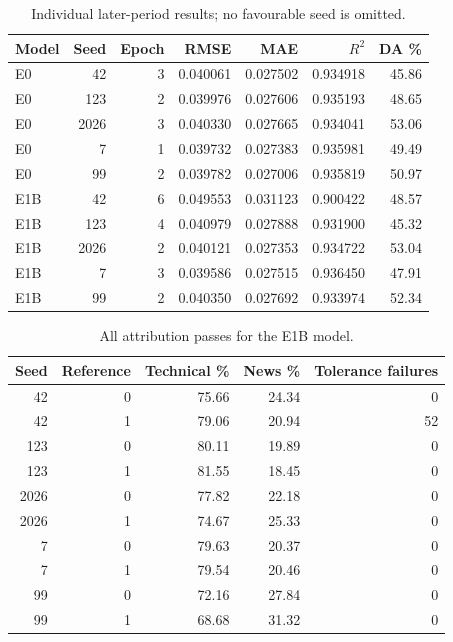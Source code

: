 \begin{table}[!htbp]\centering\small
\caption{Individual later-period results; no favourable seed is omitted.}\label{tab:seeds}
\begin{tabular}{lrrrrrr}\toprule
Model & Seed & Epoch & RMSE & MAE & $R^2$ & DA \%\\\midrule
E0 & 42 & 3 & 0.040061 & 0.027502 & 0.934918 & 45.86 \\
E0 & 123 & 2 & 0.039976 & 0.027606 & 0.935193 & 48.65 \\
E0 & 2026 & 3 & 0.040330 & 0.027665 & 0.934041 & 53.06 \\
E0 & 7 & 1 & 0.039732 & 0.027383 & 0.935981 & 49.49 \\
E0 & 99 & 2 & 0.039782 & 0.027006 & 0.935819 & 50.97 \\
E1B & 42 & 6 & 0.049553 & 0.031123 & 0.900422 & 48.57 \\
E1B & 123 & 4 & 0.040979 & 0.027888 & 0.931900 & 45.32 \\
E1B & 2026 & 2 & 0.040121 & 0.027353 & 0.934722 & 53.04 \\
E1B & 7 & 3 & 0.039586 & 0.027515 & 0.936450 & 47.91 \\
E1B & 99 & 2 & 0.040350 & 0.027692 & 0.933974 & 52.34 \\
\bottomrule\end{tabular}
\end{table}

\begin{table}[!htbp]\centering\small
\caption{All attribution passes for the E1B model.}\label{tab:shares}
\begin{tabular}{rrrrr}\toprule
Seed & Reference & Technical \% & News \% & Tolerance failures\\\midrule
42 & 0 & 75.66 & 24.34 & 0 \\
42 & 1 & 79.06 & 20.94 & 52 \\
123 & 0 & 80.11 & 19.89 & 0 \\
123 & 1 & 81.55 & 18.45 & 0 \\
2026 & 0 & 77.82 & 22.18 & 0 \\
2026 & 1 & 74.67 & 25.33 & 0 \\
7 & 0 & 79.63 & 20.37 & 0 \\
7 & 1 & 79.54 & 20.46 & 0 \\
99 & 0 & 72.16 & 27.84 & 0 \\
99 & 1 & 68.68 & 31.32 & 0 \\
\bottomrule\end{tabular}
\end{table}


